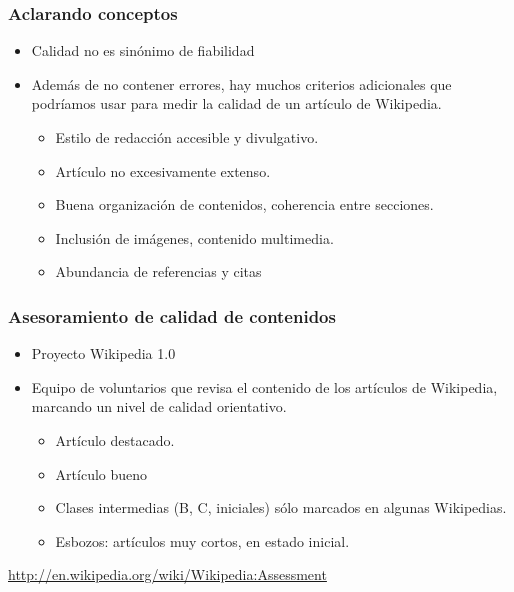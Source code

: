 \begin{frame}
\frametitle{Aclarando conceptos}

  \begin{itemize}

    \item Calidad no es sinónimo de fiabilidad

    \item Además de no contener errores, hay muchos criterios adicionales
que podríamos usar para medir la \alert{calidad} de un artículo de Wikipedia.

    \begin{itemize}
     \item Estilo de redacción accesible y divulgativo.
     \item Artículo no excesivamente extenso.
     \item Buena organización de contenidos, coherencia entre secciones.
     \item Inclusión de imágenes, contenido multimedia.
     \item Abundancia de referencias y citas 
    \end{itemize}
  \end{itemize}

\end{frame}


\begin{frame}
\frametitle{Asesoramiento de calidad de contenidos}

  \begin{itemize}

    \item Proyecto Wikipedia 1.0

    \item Equipo de voluntarios que revisa el contenido de los artículos
de Wikipedia, marcando un nivel de calidad orientativo.

    \begin{itemize}
     \item Artículo destacado.
     \item Artículo bueno
     \item Clases intermedias (B, C, iniciales) sólo marcados en algunas
Wikipedias.
     \item Esbozos: artículos muy cortos, en estado inicial.
    \end{itemize}
  \end{itemize}

\url{http://en.wikipedia.org/wiki/Wikipedia:Assessment}

\end{frame}

